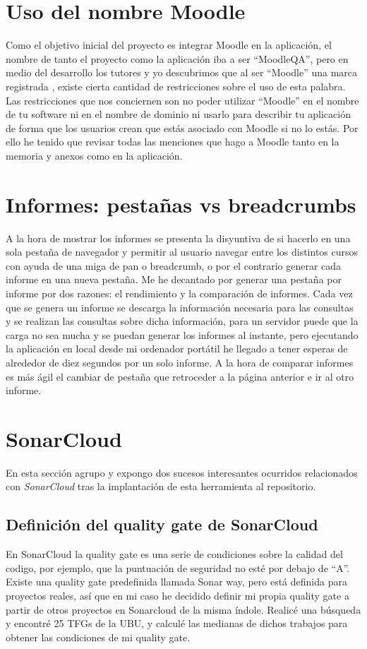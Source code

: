 \section{Uso del nombre Moodle}
Como el objetivo inicial del proyecto es integrar Moodle en la aplicación, el nombre de tanto el proyecto como la aplicación iba a ser ``MoodleQA'', pero en medio del desarrollo los tutores y yo descubrimos que al ser ``Moodle'' una marca registrada \cite{moodletrademark-2022}, existe cierta cantidad de restricciones sobre el uso de esta palabra. Las restricciones que nos conciernen son no poder utilizar ``Moodle'' en el nombre de tu software ni en el nombre de dominio ni usarlo para describir tu aplicación de forma que los usuarios crean que estás asociado con Moodle si no lo estás. Por ello he tenido que revisar todas las menciones que hago a Moodle tanto en la memoria y anexos como en la aplicación.

\section{Informes: pestañas vs breadcrumbs}
A la hora de mostrar los informes se presenta la disyuntiva de si hacerlo en una sola pestaña de navegador y permitir al usuario navegar entre los distintos cursos con ayuda de una miga de pan o breadcrumb, o por el contrario generar cada informe en una nueva pestaña. Me he decantado por generar una pestaña por informe por dos razones: el rendimiento y la comparación de informes. Cada vez que se genera un informe se descarga la información necesaria para las consultas y se realizan las consultas sobre dicha información, para un servidor puede que la carga no sea mucha y se puedan generar los informes al instante, pero ejecutando la aplicación en local desde mi ordenador portátil he llegado a tener esperas de alrededor de diez segundos por un solo informe. A la hora de comparar informes es más ágil el cambiar de pestaña que retroceder a la página anterior e ir al otro informe.

\section{SonarCloud}
En esta sección agrupo y expongo dos sucesos interesantes ocurridos relacionados con \textit{SonarCloud} tras la implantación de esta herramienta al repositorio.
\subsection{Definición del quality gate de SonarCloud}
En SonarCloud la quality gate es una serie de condiciones sobre la calidad del codigo, por ejemplo, que la puntuación de seguridad no esté por debajo de ``A''. Existe una quality gate predefinida llamada Sonar way, pero está definida para proyectos reales, así que en mi caso he decidido definir mi propia quality gate a partir de otros proyectos en Sonarcloud de la misma índole. Realicé una búsqueda y encontré 25 TFGs de la UBU, y calculé las medianas de dichos trabajos para obtener las condiciones de mi quality gate.

